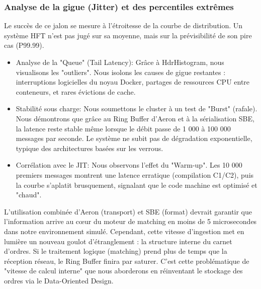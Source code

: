 \subsubsection{Analyse de la gigue (Jitter) et des percentiles extrêmes}

Le succès de ce jalon se mesure à l'étroitesse de la courbe de distribution. Un système HFT n'est pas jugé sur sa moyenne, mais sur la prévisibilité de son pire cas (P99.99).

\begin{itemize}
    \item Analyse de la "Queue" (Tail Latency): Grâce à HdrHistogram, nous visualisons les "outliers". Nous isolons les causes de gigue restantes : interruptions logicielles du noyau Docker, partages de ressources CPU entre conteneurs, et rares évictions de cache.
    \item Stabilité sous charge: Nous soumettons le cluster à un test de "Burst" (rafale). Nous démontrons que grâce au Ring Buffer d'Aeron et à la sérialisation SBE, la latence reste stable même lorsque le débit passe de 1 000 à 100 000 messages par seconde. Le système ne subit pas de dégradation exponentielle, typique des architectures basées sur les verrous.
    \item Corrélation avec le JIT: Nous observons l'effet du "Warm-up". Les 10 000 premiers messages montrent une latence erratique (compilation C1/C2), puis la courbe s'aplatit brusquement, signalant que le code machine est optimisé et "chaud".
\end{itemize}

L'utilisation combinée d'Aeron (transport) et SBE (format) devrait garantir que l'information arrive au cœur du moteur de matching en moins de 5 microsecondes dans notre environnement simulé. Cependant, cette vitesse d'ingestion met en lumière un nouveau goulot d'étranglement : la structure interne du carnet d'ordres. Si le traitement logique (matching) prend plus de temps que la réception réseau, le Ring Buffer finira par saturer. C'est cette problématique de "vitesse de calcul interne" que nous aborderons en réinventant le stockage des ordres via le Data-Oriented Design.